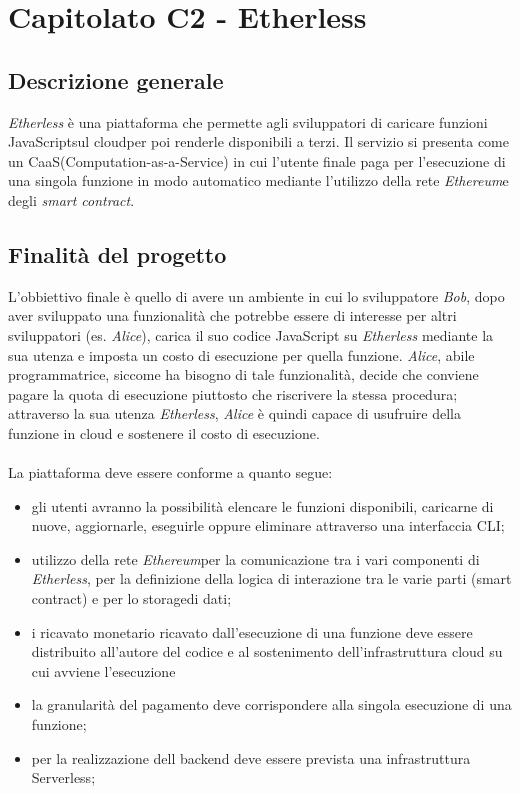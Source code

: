 \section{Capitolato C2 - Etherless}

\subsection{Descrizione generale}
\textit{Etherless} è una piattaforma che permette agli sviluppatori di caricare funzioni JavaScript\glo sul cloud\glo per poi renderle disponibili a terzi. Il servizio si presenta come un CaaS\glo (Computation-as-a-Service) in cui l'utente finale paga per l'esecuzione di una singola funzione in modo automatico mediante l'utilizzo della rete \textit{Ethereum}\glo e degli \textit{smart contract}\glo. 
\subsection{Finalità del progetto}
L'obbiettivo finale è quello di avere un ambiente in cui lo sviluppatore \textit{Bob}, dopo aver sviluppato una funzionalità che potrebbe essere di interesse per altri sviluppatori (es. \textit{Alice}), carica il suo codice JavaScript su \textit{Etherless} mediante la sua utenza e imposta un costo di esecuzione per quella funzione. \textit{Alice}, abile programmatrice, siccome ha bisogno di tale funzionalità, decide che conviene pagare la quota di esecuzione piuttosto che riscrivere la stessa procedura; attraverso la sua utenza \textit{Etherless}, \textit{Alice} è quindi capace di usufruire della funzione in cloud e sostenere il costo di esecuzione.
\\\\
La piattaforma deve essere conforme a quanto segue:
\begin{itemize}
	\item gli utenti avranno la possibilità elencare le funzioni disponibili,  caricarne di nuove, aggiornarle, eseguirle oppure eliminare attraverso una interfaccia CLI\glo;
	\item utilizzo della rete \textit{Ethereum}\glo per la comunicazione tra i vari componenti di \textit{Etherless}, per la definizione della logica di interazione tra le varie parti (smart contract\glo) e per lo storage\glo di dati;
	\item i ricavato monetario ricavato dall'esecuzione di una funzione deve essere distribuito all'autore del codice e al sostenimento dell'infrastruttura cloud su cui avviene l'esecuzione
	\item la granularità del pagamento deve corrispondere alla singola esecuzione  di una funzione;
	\item per la realizzazione dell backend deve essere prevista una infrastruttura Serverless\glo;
\end{itemize}

